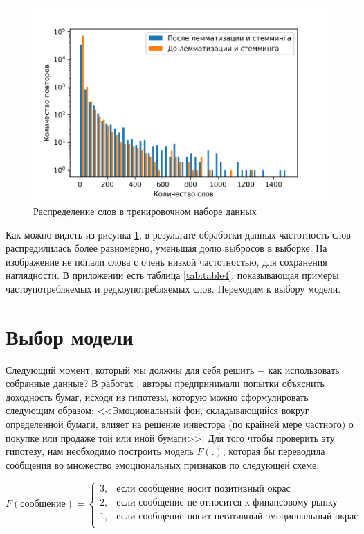 \documentclass{article}
\begin{document}
\begin{figure}[h]
	\centering
	\includegraphics[scale=0.65]{before_after.png}
	\caption{Распределение слов в тренировочном наборе данных}
	\label{pic:dist}
\end{figure}

Как можно видеть из рисунка \ref{pic:dist}, в результате обработки данных частотность слов распредилилась более равномерно, уменьшая долю выбросов в выборке. На изображение не попали слова с очень низкой частотностью, для сохранения наглядности. В приложении есть таблица \ref{tab:table4}, показывающая примеры частоупотребляемых и редкоупотребляемых слов. Переходим к выбору модели.

\section{Выбор модели}
\label{sec:model}
Следующий момент, который мы должны для себя решить $-$ как использовать собранные данные? В работах \cite{2014oli}, \cite{2017ren} авторы предпринимали попытки объяснить доходность бумаг, исходя из гипотезы, которую можно сформулировать следующим образом: <<Эмоциональный фон, складывающийся вокруг определенной бумаги, влияет на решение инвестора (по крайней мере частного) о покупке или продаже той или иной бумаги>>. Для того чтобы проверить эту гипотезу, нам необходимо построить модель $F(.)$, которая бы переводила сообщения во множество эмоциональных признаков по следующей схеме:

\begin{equation}
\label{eq:F}
F(\text{сообщение}) = 
\begin{cases}
3, &\text{если сообщение носит позитивный окрас}\\
2, &\text{если сообщение не относится к финансовому рынку} \\
1, &\text{если сообщение носит негативный эмоциональный окрас} \\
\end{cases}
\end{equation}
\end{document}
